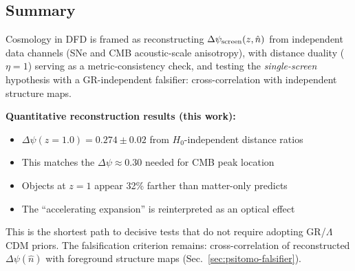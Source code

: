 \subsection{Summary}\label{sec:cosmo-summary}

Cosmology in DFD is framed as reconstructing $\Delta\psi_{\rm screen}(z,\hat n)$ from independent data channels (SNe and CMB acoustic-scale anisotropy), with distance duality ($\eta=1$) serving as a metric-consistency check, and testing the \emph{single-screen} hypothesis with a GR-independent falsifier: cross-correlation with independent structure maps.

\textbf{Quantitative reconstruction results (this work):}
\begin{itemize}
\item $\Delta\psi(z=1.0) = 0.274 \pm 0.02$ from $H_0$-independent distance ratios
\item This matches the $\Delta\psi \approx 0.30$ needed for CMB peak location
\item Objects at $z=1$ appear 32\% farther than matter-only predicts
\item The ``accelerating expansion'' is reinterpreted as an optical effect
\end{itemize}

This is the shortest path to decisive tests that do not require adopting GR/$\Lambda$CDM priors. The falsification criterion remains: cross-correlation of reconstructed $\Delta\psi(\hat n)$ with foreground structure maps (Sec.~\ref{sec:psitomo-falsifier}).
